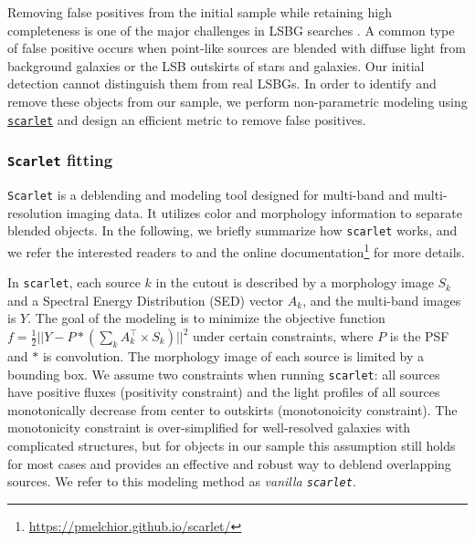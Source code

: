 \documentclass[twocolumn,astrosymb,twocolappendix]{aastex631}
\newcommand{\code}[1]{\texttt{#1}}
\begin{document}
\begin{CJK*}{UTF8}{gbsn}
Removing false positives from the initial sample while retaining high completeness is one of the major challenges in LSBG searches \citep[e.g.,][]{vanDokkum2015,Koda2015,Yagi2016,Greco2018,SAGA-I,Zaritsky2019,Zaritsky2021,Tanoglidis2021,Zaritsky2022}. A common type of false positive occurs when point-like sources are blended with diffuse light from background galaxies or the LSB outskirts of stars and galaxies. Our initial detection cannot distinguish them from real LSBGs. In order to identify and remove these objects from our sample, we perform non-parametric modeling using \href{https://pmelchior.github.io/scarlet/}{\code{scarlet}} \citep{Melchior2018} and design an efficient metric to remove false positives.


\subsubsection{\code{Scarlet} fitting}
\code{Scarlet} is a deblending and modeling tool designed for multi-band and multi-resolution imaging data. It utilizes color and morphology information to separate blended objects. In the following, we briefly summarize how \code{scarlet} works, and we refer the interested readers to \citet{Melchior2018,Melchior2021} and the online documentation\footnote{\url{https://pmelchior.github.io/scarlet/}} for more details. 

In \code{scarlet}, each source $k$ in the cutout is described by a morphology image $S_k$ and a Spectral Energy Distribution (SED) vector $A_k$, and the multi-band images is $Y$. The goal of the modeling is to minimize the objective function $f = \frac{1}{2} ||Y - P \ast (\sum_k A_k^\top \times S_k)||^{2}$ under certain constraints, where $P$ is the PSF and $*$ is convolution. The morphology image of each source is limited by a bounding box. We assume two constraints when running \code{scarlet}: all sources have positive fluxes (positivity constraint) and the light profiles of all sources monotonically decrease from center to outskirts (monotonoicity constraint). The monotonicity constraint is over-simplified for well-resolved galaxies with complicated structures, but for objects in our sample this assumption still holds for most cases and provides an effective and robust way to deblend overlapping sources. We refer to this modeling method as \textit{vanilla \code{scarlet}}. 



\end{CJK*}
\end{document}
